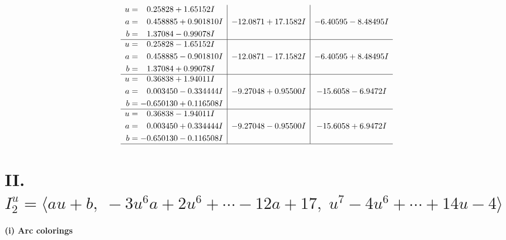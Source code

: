 \documentclass[1p]{elsarticle_modified}
\theoremstyle{definition}
\begin{document}
$$\begin{array}{c|c|c}
\begin{aligned}
u &= \phantom{-}0.25828 + 1.65152 I \\
a &= \phantom{-}0.458885 + 0.901810 I \\
b &= \phantom{-}1.37084 - 0.99078 I\end{aligned}
 & -12.0871 + 17.1582 I & -6.40595 - 8.48495 I \\ \hline\begin{aligned}
u &= \phantom{-}0.25828 - 1.65152 I \\
a &= \phantom{-}0.458885 - 0.901810 I \\
b &= \phantom{-}1.37084 + 0.99078 I\end{aligned}
 & -12.0871 - 17.1582 I & -6.40595 + 8.48495 I \\ \hline\begin{aligned}
u &= \phantom{-}0.36838 + 1.94011 I \\
a &= \phantom{-}0.003450 - 0.334444 I \\
b &= -0.650130 + 0.116508 I\end{aligned}
 & -9.27048 + 0.95500 I & -15.6058 - 6.9472 I \\ \hline\begin{aligned}
u &= \phantom{-}0.36838 - 1.94011 I \\
a &= \phantom{-}0.003450 + 0.334444 I \\
b &= -0.650130 - 0.116508 I\end{aligned}
 & -9.27048 - 0.95500 I & -15.6058 + 6.9472 I\\
 \hline 
 \end{array}$$\newpage\newpage\renewcommand{\arraystretch}{1}
\centering \section*{II. $I^u_{2}= \langle a u+b,\;-3 u^6 a+2 u^6+\cdots-12 a+17,\;u^7-4 u^6+\cdots+14 u-4 \rangle$}
\flushleft \textbf{(i) Arc colorings}\\
\end{document}
